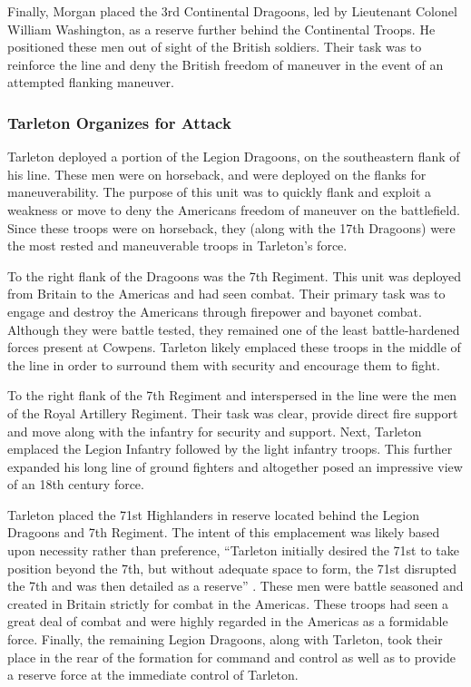 Finally, Morgan placed the 3rd Continental Dragoons, led by Lieutenant Colonel
William Washington, as a reserve further behind the Continental Troops.  He
positioned these men out of sight of the British soldiers.  Their task was to
reinforce the line and deny the British freedom of maneuver in the event of an
attempted flanking maneuver. 

\subsubsection{Tarleton Organizes for Attack}

Tarleton deployed a portion of the Legion Dragoons, on the southeastern flank of
his line.  These men were on horseback, and were deployed on the flanks for
maneuverability.  The purpose of this unit was to quickly flank and exploit a
weakness or move to deny the Americans freedom of maneuver on the battlefield.
Since these troops were on horseback, they (along with the 17th Dragoons) were
the most rested and maneuverable troops in Tarleton’s force.   

To the right flank of the Dragoons was the 7th Regiment.  This unit was deployed
from Britain to the Americas and had seen combat.  Their primary task was to
engage and destroy the Americans through firepower and bayonet combat.  Although
they were battle tested, they remained one of the least battle-hardened forces
present at Cowpens.  Tarleton likely emplaced these troops in the middle of the
line in order to surround them with security and encourage them to fight.  

To the right flank of the 7th Regiment and interspersed in the line were the men
of the Royal Artillery Regiment.  Their task was clear, provide direct fire
support and move along with the infantry for security and support.  Next,
Tarleton emplaced the Legion Infantry followed by the light infantry troops.
This further expanded his long line of ground fighters and altogether posed an
impressive view of an 18th century force.

Tarleton placed the 71st Highlanders in reserve located behind the Legion
Dragoons and 7th Regiment.  The intent of this emplacement was likely based upon
necessity rather than preference, “Tarleton initially desired the 71st to take
position beyond the 7th, but without adequate space to form, the 71st disrupted
the 7th and was then detailed as a reserve” \cite[p.84]{babits_devil_2001}.  These men were
battle seasoned and created in Britain strictly for combat in the Americas.
These troops had seen a great deal of combat and were highly regarded in the
Americas as a formidable force.  Finally, the remaining Legion Dragoons, along
with Tarleton, took their place in the rear of the formation for command and
control as well as to provide a reserve force at the immediate control of
Tarleton.

